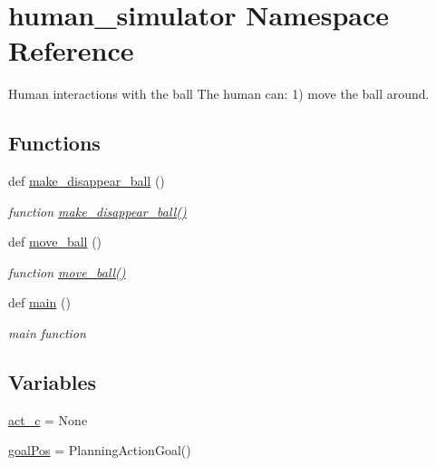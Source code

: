 \hypertarget{namespacehuman__simulator}{}\section{human\+\_\+simulator Namespace Reference}
\label{namespacehuman__simulator}


Human interactions with the ball The human can\+: 1) move the ball around.  


\subsection*{Functions}
\begin{DoxyCompactItemize}
\item 
def \hyperlink{namespacehuman__simulator_a4e00db04bb9f513c32ed695f315d525f}{make\+\_\+disappear\+\_\+ball} ()
\begin{DoxyCompactList}\small\item\em function \hyperlink{namespacehuman__simulator_a4e00db04bb9f513c32ed695f315d525f}{make\+\_\+disappear\+\_\+ball()} \end{DoxyCompactList}\item 
def \hyperlink{namespacehuman__simulator_aebb3c3946d1ca4e8a8fe5d6762296cec}{move\+\_\+ball} ()
\begin{DoxyCompactList}\small\item\em function \hyperlink{namespacehuman__simulator_aebb3c3946d1ca4e8a8fe5d6762296cec}{move\+\_\+ball()} \end{DoxyCompactList}\item 
def \hyperlink{namespacehuman__simulator_adb91dbb164188ff85ca65a1c0380a16a}{main} ()
\begin{DoxyCompactList}\small\item\em main function \end{DoxyCompactList}\end{DoxyCompactItemize}
\subsection*{Variables}
\begin{DoxyCompactItemize}
\item 
\hyperlink{namespacehuman__simulator_a3df97310032b13c3a872db61817147a4}{act\+\_\+c} = None
\item 
\hyperlink{namespacehuman__simulator_a9c29a9b3b5c8150e808af93b318f0f30}{goal\+Pos} = Planning\+Action\+Goal()
\end{DoxyCompactItemize}


